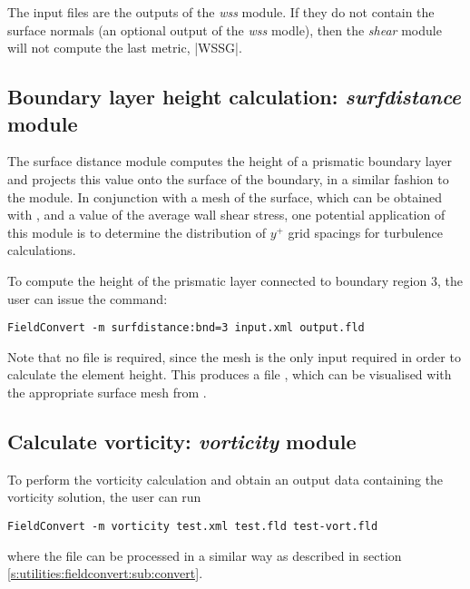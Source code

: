 The input  files are the outputs of the \textit{wss} module. If they do not contain the surface normals (an optional output of the \textit{wss} modle), then the \textit{shear} module will not compute the last metric, |WSSG|. 


%
%
%
\subsection{Boundary layer height calculation: \textit{surfdistance} module}

The surface distance module computes the height of a prismatic boundary layer
and projects this value onto the surface of the boundary, in a similar fashion
to the  module. In conjunction with a mesh of the surface, which
can be obtained with , and a value of the average wall shear
stress, one potential application of this module is to determine the
distribution of $y^+$ grid spacings for turbulence calculations.

To compute the height of the prismatic layer connected to boundary region 3, the
user can issue the command:
\begin{lstlisting}[style=BashInputStyle]
FieldConvert -m surfdistance:bnd=3 input.xml output.fld
\end{lstlisting}
Note that no  file is required, since the mesh is the only input
required in order to calculate the element height. This produces a file
, which can be visualised with the appropriate surface
mesh from .

%
%
%
\subsection{Calculate vorticity: \textit{vorticity} module}
To perform the vorticity calculation and obtain an output 
data containing the vorticity solution, the user can run
\begin{lstlisting}[style=BashInputStyle]
FieldConvert -m vorticity test.xml test.fld test-vort.fld
\end{lstlisting}
where the file  can be processed in a similar 
way as described in section \ref{s:utilities:fieldconvert:sub:convert}.
%
%
%

